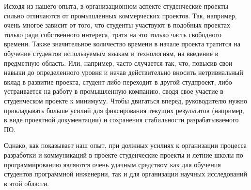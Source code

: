\documentclass[a4paper]{article}
\begin{document}
Исходя из нашего опыта, в организационном аспекте студенческие проекты сильно отличаются от промышленных коммерческих проектов. Так, например, очень многое зависит от того, что студенты участвуют в подобных проектах только ради собственного интереса, тратя на это только часть свободного времени. Также значительное количество времени в начале проекта тратится на обучение студентов используемым языкам и технологиям, на введение в предметную область. Или, например, часто случается так, что, повысив свои навыки до определенного уровня и начав действительно вносить нетривиальный вклад в развитие проекта, студент либо переходит в другой студпроект, либо устраивается на работу в промышленную компанию, сводя свое участие в студенческом проекте к минимуму. Чтобы двигаться вперед, руководителю нужно прикладывать больше усилий для фиксирования текущих результатов (например, в виде проектной документации) и сохранения стабильности разрабатываемого ПО. 

Однако, как показывает наш опыт, при должных усилиях к организации процесса разработки и коммуникаций в проекте студенческие проекты и летние школы по программированию являются очень удачным средством как для обучения студентов программной инженерии, так и для организации научных исследований в этой области. 
\end{document}
